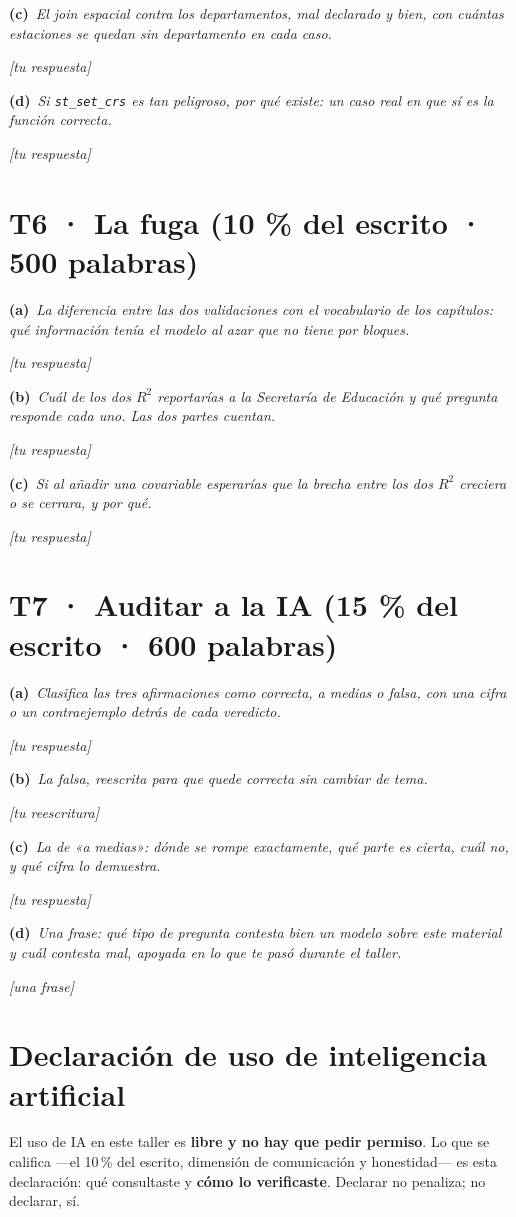 \documentclass[11pt,a4paper,oneside]{article}
\newcommand{\marcador}[1]{\textcolor{grismarcador}{\textit{[#1]}}}
\newcommand{\tarea}[4]{%
  \section[#1 · #2]{#1 · #2 \normalfont\small\color{grismarcador}(#3 \% del escrito · #4 palabras)}%
  \markboth{#1 · #2}{}}
\newcommand{\literal}[2]{\vspace{0.35\baselineskip}\noindent\textbf{(#1)}~\textit{#2}\par}
\begin{document}
\literal{c}{El \emph{join} espacial contra los departamentos, mal declarado y bien, con cuántas estaciones se quedan sin departamento en cada caso.}
\marcador{tu respuesta}

\literal{d}{Si \texttt{st\_set\_crs} es tan peligroso, por qué existe: un caso real en que sí es la función correcta.}
\marcador{tu respuesta}

\tarea{T6}{La fuga}{10}{500}
\literal{a}{La diferencia entre las dos validaciones con el vocabulario de los capítulos: qué información tenía el modelo al azar que no tiene por bloques.}
\marcador{tu respuesta}

\literal{b}{Cuál de los dos $R^2$ reportarías a la Secretaría de Educación y qué pregunta responde cada uno. Las dos partes cuentan.}
\marcador{tu respuesta}

\literal{c}{Si al añadir una covariable esperarías que la brecha entre los dos $R^2$ creciera o se cerrara, y por qué.}
\marcador{tu respuesta}

\tarea{T7}{Auditar a la IA}{15}{600}
\literal{a}{Clasifica las tres afirmaciones como correcta, a medias o falsa, con una cifra o un contraejemplo detrás de cada veredicto.}
\marcador{tu respuesta}

\literal{b}{La falsa, reescrita para que quede correcta sin cambiar de tema.}
\marcador{tu reescritura}

\literal{c}{La de «a medias»: dónde se rompe exactamente, qué parte es cierta, cuál no, y qué cifra lo demuestra.}
\marcador{tu respuesta}

\literal{d}{Una frase: qué tipo de pregunta contesta bien un modelo sobre este material y cuál contesta mal, apoyada en lo que te pasó durante el taller.}
\marcador{una frase}

\newpage
\section{Declaración de uso de inteligencia artificial}

El uso de IA en este taller es \textbf{libre y no hay que pedir permiso}. Lo que se califica —el
10\,\% del escrito, dimensión de comunicación y honestidad— es esta declaración: qué consultaste y
\textbf{cómo lo verificaste}. Declarar no penaliza; no declarar, sí.
\end{document}
